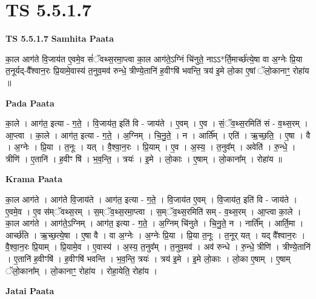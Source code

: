 \documentclass[17pt]{extarticle}
\begin{document}
\section{ TS 5.5.1.7 }

\textbf{TS 5.5.1.7 } \newline
\textbf{Samhita Paata} \newline

का॒ल आग॑ते वि॒जाय॑त ए॒वमे॒व सं॑ॅवथ्स॒रमा॒प्त्वा का॒ल आग॑ते॒ऽग्निं चि॑नुते॒ नाऽऽ*र्ति॒मार्च्छ॑त्ये॒षा वा अ॒ग्नेः प्रि॒या त॒नूर्यद्-वै᳚श्वान॒रः प्रि॒यामे॒वास्य॑ त॒नुव॒मव॑ रुन्धे॒ त्रीण्ये॒तानि॑ ह॒वीꣳषि॑ भवन्ति॒ त्रय॑ इ॒मे लो॒का ए॒षां ॅलो॒कानाꣳ॒॒ रोहा॑य ॥ \newline

\textbf{Pada Paata} \newline

का॒ले । आग॑त॒ इत्या - ग॒ते॒ । वि॒जाय॑त॒ इति॑ वि - जाय॑ते । ए॒वम् । ए॒व । सं॒ॅव॒थ्स॒रमिति॑ सं - व॒थ्स॒रम् । आ॒प्त्वा । का॒ले । आग॑त॒ इत्या - ग॒ते॒ । अ॒ग्निम् । चि॒नु॒ते॒ । न । आर्ति᳚म् । एति॑ । ऋ॒च्छ॒ति॒ । ए॒षा । वै । अ॒ग्नेः । प्रि॒या । त॒नूः । यत् । वै॒श्वा॒न॒रः । प्रि॒याम् । ए॒व । अ॒स्य॒ । त॒नुव᳚म् । अवेति॑ । रु॒न्धे॒ । त्रीणि॑ । ए॒तानि॑ । ह॒वीꣳ षि॑ । भ॒व॒न्ति॒ । त्रयः॑ । इ॒मे । लो॒काः । ए॒षाम् । लो॒काना᳚म् । रोहा॑य ॥  \newline


\textbf{Krama Paata} \newline

का॒ल आग॑ते । आग॑ते वि॒जाय॑ते । आग॑त॒ इत्या - ग॒ते॒ । वि॒जाय॑त ए॒वम् । वि॒जाय॑त॒ इति॑ वि - जाय॑ते । ए॒वमे॒व । ए॒व स॑म्ॅवथ्स॒रम् । स॒म्ॅव॒थ्स॒रमा॒प्त्वा । स॒म्ॅव॒थ्स॒रमिति॑ सम् - व॒थ्स॒रम् । आ॒प्त्वा का॒ले । का॒ल आग॑ते । आग॑ते॒ऽग्निम् । आग॑त॒ इत्या - ग॒ते॒ । अ॒ग्निम् चि॑नुते । चि॒नु॒ते॒ न । नार्ति᳚म् । आर्ति॒मा । आर्च्छ॑ति । ऋ॒च्छ॒त्ये॒षा । ए॒षा वै । वा अ॒ग्नेः । अ॒ग्नेः प्रि॒या । प्रि॒या त॒नूः । त॒नूर् यत् । यद् वै᳚श्वान॒रः । वै॒श्वा॒न॒रः प्रि॒याम् । प्रि॒यामे॒व । ए॒वास्य॑ । अ॒स्य॒ त॒नुव᳚म् । त॒नुव॒मव॑ । अव॑ रुन्धे । रु॒न्धे॒ त्रीणि॑ । त्रीण्ये॒तानि॑ । ए॒तानि॑ ह॒वीꣳषि॑ । ह॒वीꣳषि॑ भवन्ति । भ॒व॒न्ति॒ त्रयः॑ । त्रय॑ इ॒मे । इ॒मे लो॒काः । लो॒का ए॒षाम् । ए॒षाम् ॅलो॒काना᳚म् । लो॒कानाꣳ॒॒ रोहा॑य । रोहा॒येति॒ रोहा॑य । \newline

\textbf{Jatai Paata} \newline
\end{document}

